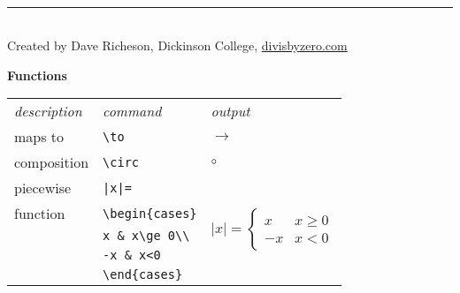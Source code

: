 \documentclass[10pt,landscape]{article}
\newcommand{\ColorSubsection}[1]{\par\vspace{1ex}\noindent\textcolor{subsectioncolor}{\normalsize\bfseries #1}\par\vspace{0.5ex}}
\begin{document}
\begin{multicols}{3}
\vfill
~\\

\hrule
~\\

Created by Dave Richeson, Dickinson College, \url{divisbyzero.com}

\newpage

\ColorSubsection{Functions}
\begin{tabular}{lll}
\emph{description} & \emph{command} & \emph{output}\\
maps to & \verb!\to! & $\to$\\
composition& \verb!\circ! & $\circ$\\
piecewise& \verb!|x|=! & \multirow{5}{*}{$\displaystyle |x|=\begin{cases}x&x\ge 0\\-x&x<0\end{cases}$}\\
function&\verb!\begin{cases}!&\\ 
&\verb!x & x\ge 0\\!&\\ 
&\verb!-x & x<0!&\\ 
&\verb!\end{cases}!&
\end{tabular}


\end{multicols}
\end{document}
